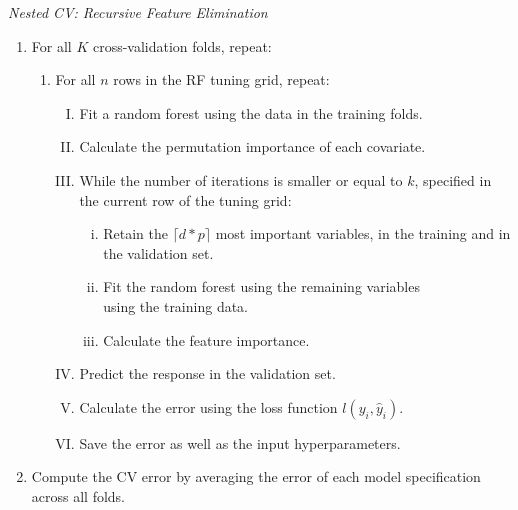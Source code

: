 \documentclass[a4paper,12pt, headsepline]{scrartcl}
\numberwithin{equation}{section}
\begin{document}
{\centering
\begin{minipage}{.9\linewidth}
	\begin{algorithm}[H]
		\caption{\textit{Nested CV: Recursive Feature Elimination}}\label{alg:four}
		\begin{enumerate}
			\item For all $K$ cross-validation folds, repeat:
			\begin{enumerate}
				\item For all $n$ rows in the RF tuning grid, repeat:
				\begin{enumerate}[I.]
					\item Fit a random forest using the data in the training folds.
					\item Calculate the permutation importance of each covariate.
					\item While the number of iterations is smaller or equal to $k$, specified in the current row of the tuning grid:
					\begin{enumerate}[i.]
						\item Retain the $\lceil d*p \rceil$ most important variables, in the training and in the validation set.
						\item Fit the random forest using the remaining variables\\ using the training data.
						\item Calculate the feature importance.
					\end{enumerate}
					\item Predict the response in the validation set.
					\item Calculate the error using the loss function $l(y_i, \hat y_i)$.
					\item Save the error as well as the input hyperparameters. 
				\end{enumerate} 
			\end{enumerate}
			\item Compute the CV error by averaging the error of each model specification across all folds.
		\end{enumerate}
	\end{algorithm}
\end{minipage}
	\par
}
\end{document}
